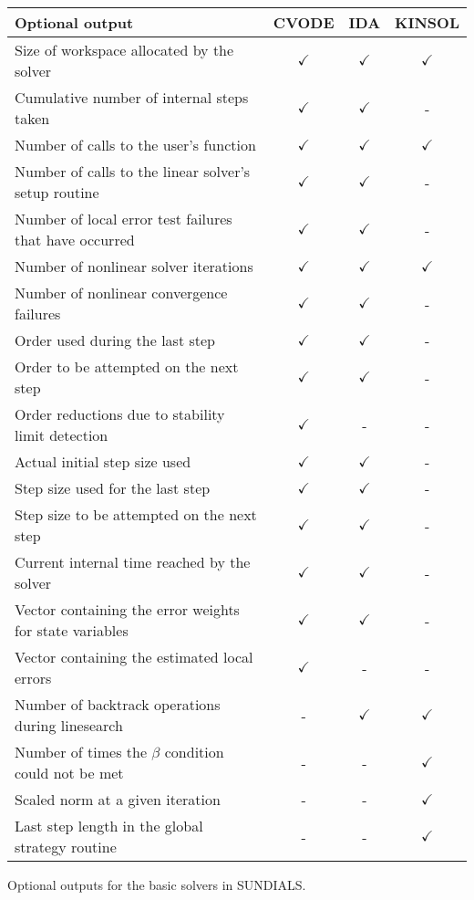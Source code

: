 \begin{acmtable}{327pt}
\centering
\begin{tabular}{p{2.75in} c c c }
Optional output & CVODE  & IDA & KINSOL \\
\hline
Size of workspace allocated by the solver & $\checkmark$ & $\checkmark$ & $\checkmark$ \\
Cumulative number of internal steps taken & $\checkmark$ & $\checkmark$ & - \\
Number of calls to the user's function & $\checkmark$ & $\checkmark$ & $\checkmark$ \\
Number of calls to the linear solver's setup routine & $\checkmark$ & $\checkmark$ & - \\
Number of local error test failures that have occurred & $\checkmark$ & $\checkmark$ & - \\
Number of nonlinear solver iterations & $\checkmark$ & $\checkmark$ & $\checkmark$ \\
Number of nonlinear convergence failures & $\checkmark$ & $\checkmark$ & - \\
Order used during the last step & $\checkmark$ & $\checkmark$ & - \\
Order to be attempted on the next step & $\checkmark$ & $\checkmark$ & - \\
Order reductions due to stability limit detection & $\checkmark$ & - & - \\
Actual initial step size used & $\checkmark$ & $\checkmark$ & - \\
Step size used for the last step & $\checkmark$ & $\checkmark$ & - \\
Step size to be attempted on the next step & $\checkmark$ & $\checkmark$ & - \\
Current internal time reached by the solver & $\checkmark$ & $\checkmark$ & - \\
Vector containing the error weights for state variables & $\checkmark$ & $\checkmark$ & - \\
Vector containing the estimated local errors & $\checkmark$ & - & - \\
Number of backtrack operations during linesearch & - & $\checkmark$ & $\checkmark$ \\
Number of times the $\beta$ condition could not be met & - & - & $\checkmark$ \\
Scaled norm at a given iteration & - & - & $\checkmark$ \\
Last step length in the global strategy routine & - & - & $\checkmark$ \\
\end{tabular}
\caption{Optional outputs for the basic solvers in SUNDIALS.}
\label{t:optional_output}
\end{acmtable}

